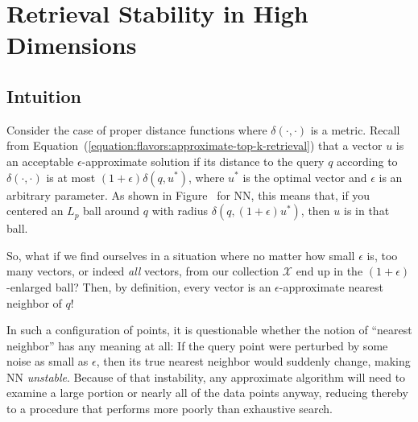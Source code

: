 \chapter{Retrieval Stability in High Dimensions}
\label{chapter:instability}


\section{Intuition}
\label{chapter:instability:stability:intuition}
Consider the case of proper distance functions where $\delta(\cdot, \cdot)$ is a metric.
Recall from Equation~(\ref{equation:flavors:approximate-top-k-retrieval}) that a vector
$u$ is an acceptable $\epsilon$-approximate solution if its distance to the query $q$ according to $\delta(\cdot, \cdot)$
is at most $(1 + \epsilon) \delta(q, u^\ast)$, where $u^\ast$ is the optimal vector
and $\epsilon$ is an arbitrary parameter.
As shown in Figure~ for NN,
this means that, if you centered an $L_p$ ball around $q$ with
radius $\delta(q, (1 + \epsilon) u^\ast)$, then $u$ is in that ball.

So, what if we find ourselves in a situation where no matter how small $\epsilon$ is,
too many vectors, or indeed \emph{all} vectors, from our collection $\mathcal{X}$ end up
in the $(1+\epsilon)$-enlarged ball? Then, by definition, every vector is an $\epsilon$-approximate nearest neighbor of $q$!

In such a configuration of points,
it is questionable whether the notion of ``nearest neighbor'' has any meaning at all:
If the query point were perturbed by some noise as small as $\epsilon$,
then its true nearest neighbor would suddenly change, making NN \emph{unstable}.
Because of that instability, any approximate algorithm will need to examine a large portion or nearly all
of the data points anyway, reducing thereby to a procedure that performs
more poorly than exhaustive search.

